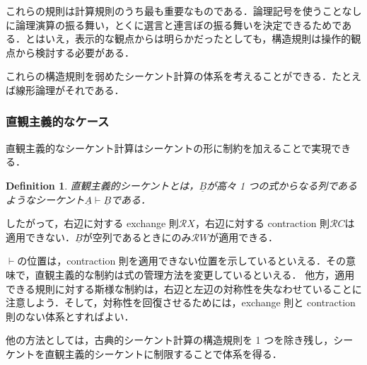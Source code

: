 \documentclass[a4paper,10pt,platex, dvipdfmx]{jsarticle}
\newtheorem{definition}{Definition}
\begin{document}
\begin{enumerate}
\begin{figure}[H]
    \begin{minipage}[b]{0.45\columnwidth}
        \begin{prooftree}
        \end{prooftree}
    \end{minipage}
    \begin{minipage}[b]{0.45\columnwidth}
        \begin{prooftree}
        \end{prooftree}
    \end{minipage}
\end{figure}
\end{enumerate}
これらの規則は計算規則のうち最も重要なものである．論理記号を使うことなしに論理演算の振る舞い，とくに選言と連言ぼの振る舞いを決定できるためである．とはいえ，表示的な観点からは明らかだったとしても，構造規則は操作的観点から検討する必要がある．

これらの構造規則を弱めたシーケント計算の体系を考えることができる．たとえば線形論理がそれである．

\subsubsection{直観主義的なケース}
直観主義的なシーケント計算はシーケントの形に制約を加えることで実現できる．
\begin{definition}
\emph{直観主義的シーケント}とは，$\underline{B}$が高々 1 つの式からなる列であるようなシーケント$\underline{A}\vdash\underline{B}$である．
\end{definition}
したがって，右辺に対する exchange 則$\mathcal{R}X$，右辺に対する contraction 則$\mathcal{R}C$は適用できない．$\underline{B}$が空列であるときにのみ$\mathcal{R}W$が適用できる．

$\vdash$の位置は，contraction 則を適用できない位置を示しているといえる．その意味で，直観主義的な制約は式の管理方法を変更しているといえる．
他方，適用できる規則に対する斯様な制約は，右辺と左辺の対称性を失なわせていることに注意しよう．そして，対称性を回復させるためには，exchange 則と contraction 則のない体系とすればよい．

他の方法としては，古典的シーケント計算の構造規則を 1 つを除き残し，シーケントを直観主義的シーケントに制限することで体系を得る．
\end{document}
